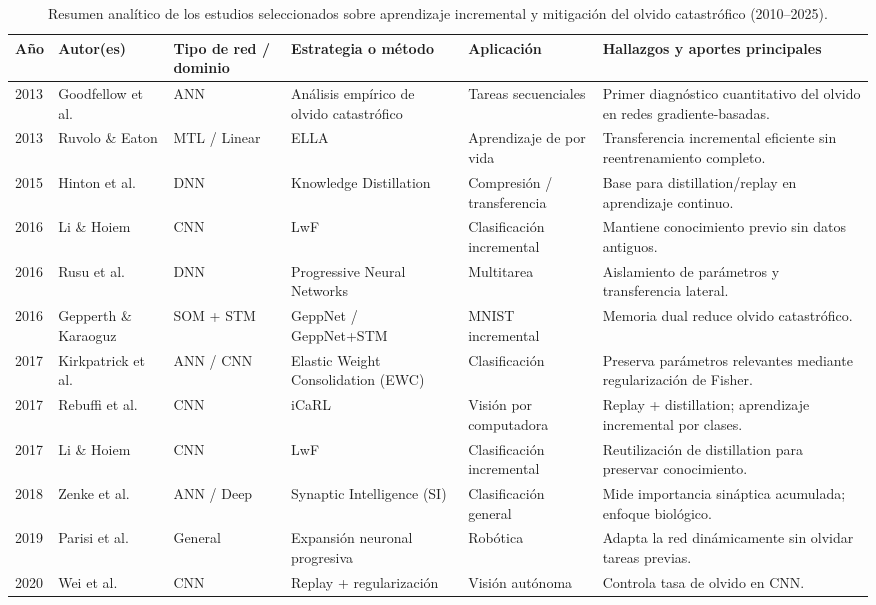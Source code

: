 \documentclass[10pt,a4paper]{article}
\begin{document}
\begin{table}[H]
\centering
\caption{Resumen analítico de los estudios seleccionados sobre aprendizaje incremental y mitigación del olvido catastrófico (2010–2025).}
\label{tab:resumen-estudios}
\renewcommand{\arraystretch}{1.2}
\scriptsize
\begin{tabularx}{\textwidth}{p{1.3cm} p{2.6cm} p{2.5cm} p{2.4cm} p{2.3cm} X}
\toprule
\textbf{Año} & \textbf{Autor(es)} & \textbf{Tipo de red / dominio} & \textbf{Estrategia o método} & \textbf{Aplicación} & \textbf{Hallazgos y aportes principales} \\
\midrule
2013 & Goodfellow et al. & ANN & Análisis empírico de olvido catastrófico & Tareas secuenciales & Primer diagnóstico cuantitativo del olvido en redes gradiente-basadas. \\
2013 & Ruvolo \& Eaton & MTL / Linear & ELLA & Aprendizaje de por vida & Transferencia incremental eficiente sin reentrenamiento completo. \\
2015 & Hinton et al. & DNN & Knowledge Distillation & Compresión / transferencia & Base para distillation/replay en aprendizaje continuo. \\
2016 & Li \& Hoiem & CNN & LwF & Clasificación incremental & Mantiene conocimiento previo sin datos antiguos. \\
2016 & Rusu et al. & DNN & Progressive Neural Networks & Multitarea & Aislamiento de parámetros y transferencia lateral. \\
2016 & Gepperth \& Karaoguz & SOM + STM & GeppNet / GeppNet+STM & MNIST incremental & Memoria dual reduce olvido catastrófico. \\
2017 & Kirkpatrick et al. & ANN / CNN & Elastic Weight Consolidation (EWC) & Clasificación & Preserva parámetros relevantes mediante regularización de Fisher. \\
2017 & Rebuffi et al. & CNN & iCaRL & Visión por computadora & Replay + distillation; aprendizaje incremental por clases. \\
2017 & Li \& Hoiem & CNN & LwF & Clasificación incremental & Reutilización de distillation para preservar conocimiento. \\
2018 & Zenke et al. & ANN / Deep & Synaptic Intelligence (SI) & Clasificación general & Mide importancia sináptica acumulada; enfoque biológico. \\
2019 & Parisi et al. & General & Expansión neuronal progresiva & Robótica & Adapta la red dinámicamente sin olvidar tareas previas. \\
2020 & Wei et al. & CNN & Replay + regularización & Visión autónoma & Controla tasa de olvido en CNN. \\

\end{tabularx}
\end{table}
\end{document}
